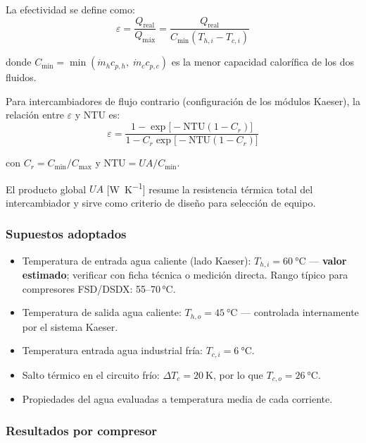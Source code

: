 \documentclass[11pt,a4paper]{article}
\begin{document}
La efectividad se define como:
\begin{equation}
  \varepsilon = \frac{Q_{\text{real}}}{Q_{\text{máx}}} = \frac{Q_{\text{real}}}{C_{\min}(T_{h,i} - T_{c,i})}
  \label{eq:epsilon}
\end{equation}

donde $C_{\min} = \min(\dot{m}_h c_{p,h},\; \dot{m}_c c_{p,c})$ es la menor capacidad
calorífica de los dos fluidos.

Para intercambiadores de flujo contrario (configuración de los módulos Kaeser), la
relación entre $\varepsilon$ y NTU es:
\begin{equation}
  \varepsilon = \frac{1 - \exp\!\bigl[-\mathrm{NTU}(1 - C_r)\bigr]}
                     {1 - C_r\exp\!\bigl[-\mathrm{NTU}(1 - C_r)\bigr]}
  \label{eq:eps_ntu}
\end{equation}

con $C_r = C_{\min}/C_{\max}$ y $\mathrm{NTU} = UA / C_{\min}$.

El producto global $UA$ [\si{\watt\per\kelvin}] resume la resistencia térmica total del
intercambiador y sirve como criterio de diseño para selección de equipo.

\subsubsection{Supuestos adoptados}

\begin{itemize}
  \item Temperatura de entrada agua caliente (lado Kaeser): $T_{h,i} = \SI{60}{\celsius}$
        — \textbf{valor estimado}; verificar con ficha técnica o medición directa.
        Rango típico para compresores FSD/DSDX: 55–70\,°C.
  \item Temperatura de salida agua caliente: $T_{h,o} = \SI{45}{\celsius}$ — controlada
        internamente por el sistema Kaeser.
  \item Temperatura entrada agua industrial fría: $T_{c,i} = \SI{6}{\celsius}$.
  \item Salto térmico en el circuito frío: $\Delta T_c = \SI{20}{\kelvin}$, por lo que
        $T_{c,o} = \SI{26}{\celsius}$.
  \item Propiedades del agua evaluadas a temperatura media de cada corriente.
\end{itemize}

\subsubsection{Resultados por compresor}
\end{document}
